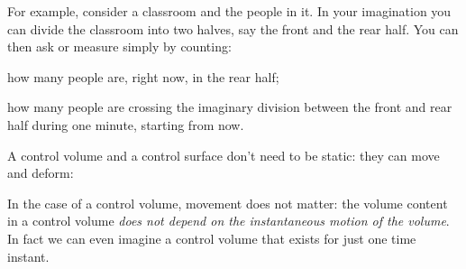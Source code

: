 \documentclass[a4paper,12pt,%
onecolumn,oneside,%
british%
]{memoir}
\renewcommand*{\|}[1][]{\nonscript\:#1\vert\nonscript\:\mathopen{}}
\begin{document}
For example, consider a classroom and the people in it. In your imagination you can divide the classroom into two halves, say the front and the rear half. You can then ask or measure simply by counting:\enspace
\begin{enumerate*}[label=(\arabic*)]
\item how many people are, right now, in the rear half;\enspace
\item how many people are crossing the imaginary division between the front and rear half during one minute, starting from now.
\end{enumerate*}


\smallskip

A control volume and a control surface don't need to be static: they can move and deform:

In the case of a control volume, movement does not matter: the volume content in a control volume \emph{does not depend on the instantaneous motion of the volume}. In fact we can even imagine a control volume that exists for just one time instant.
\end{document}
